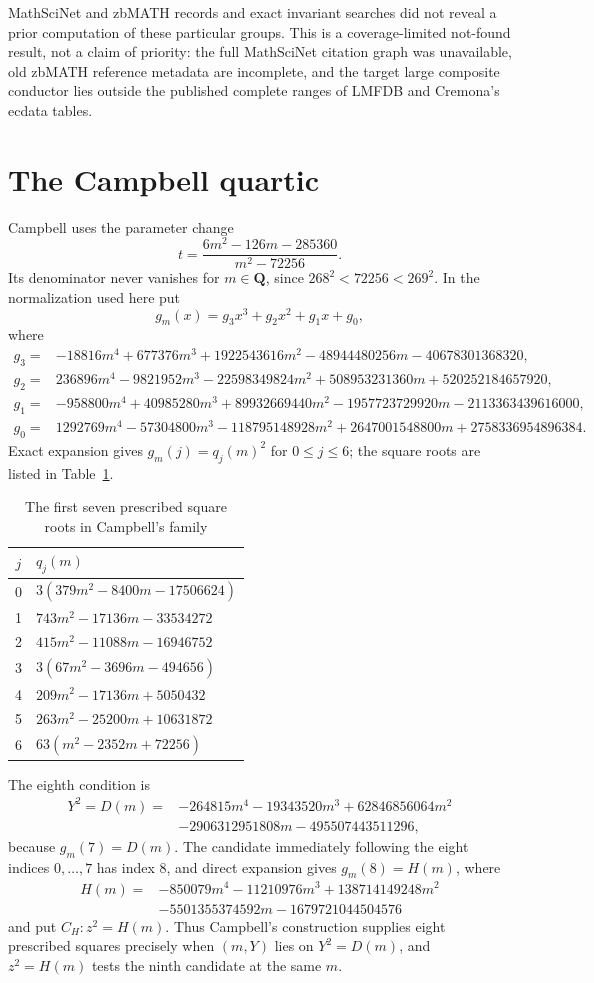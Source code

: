 \documentclass[11pt]{article}
\newcommand{\Q}{\mathbf Q}
\begin{document}
MathSciNet and zbMATH records and exact invariant searches did not reveal a
prior computation of these particular groups. This is a coverage-limited
not-found result, not a claim of priority: the full MathSciNet citation graph
was unavailable, old zbMATH reference metadata are incomplete, and the target
large composite conductor lies outside the published complete ranges of
LMFDB and Cremona's ecdata tables.

\section{The Campbell quartic}
Campbell \cite[Corollary~2.4 and Theorem~2.5]{Campbell2003} uses the
parameter change
\[
 t=\frac{6m^2-126m-285360}{m^2-72256}.
\]
Its denominator never vanishes for $m\in\Q$, since
$268^2<72256<269^2$.  In the normalization used here put
\[
 g_m(x)=g_3x^3+g_2x^2+g_1x+g_0,
\]
where
\begin{align*}
g_3={}&-18816m^4+677376m^3+1922543616m^2-48944480256m
-40678301368320,\\
g_2={}&236896m^4-9821952m^3-22598349824m^2+508953231360m
+520252184657920,\\
g_1={}&-958800m^4+40985280m^3+89932669440m^2-1957723729920m
-2113363439616000,\\
g_0={}&1292769m^4-57304800m^3-118795148928m^2+2647001548800m
+2758336954896384.
\end{align*}
Exact expansion gives $g_m(j)=q_j(m)^2$ for $0\le j\le6$; the square roots
are listed in Table~\ref{tab:campbell-roots}.
\begin{table}[ht]
\centering\small
\caption{The first seven prescribed square roots in Campbell's family}
\label{tab:campbell-roots}
\begin{tabular}{c@{\quad}l}
\toprule
$j$&$q_j(m)$\\ \midrule
0&$3(379m^2-8400m-17506624)$\\
1&$743m^2-17136m-33534272$\\
2&$415m^2-11088m-16946752$\\
3&$3(67m^2-3696m-494656)$\\
4&$209m^2-17136m+5050432$\\
5&$263m^2-25200m+10631872$\\
6&$63(m^2-2352m+72256)$\\ \bottomrule
\end{tabular}
\end{table}
The eighth condition is
\[
\begin{aligned}
Y^2=D(m)={}&-264815m^4-19343520m^3+62846856064m^2\\
&-2906312951808m-495507443511296,
\end{aligned}
\]
because $g_m(7)=D(m)$.  The candidate immediately following the eight
indices $0,\ldots,7$ has index $8$, and direct expansion gives $g_m(8)=H(m)$,
where
\[
 \begin{aligned}
 H(m)={}&-850079m^4-11210976m^3+138714149248m^2\\
        &-5501355374592m-1679721044504576
 \end{aligned}
\]
and put $C_H:z^2=H(m)$.  Thus Campbell's construction supplies eight
prescribed squares precisely when $(m,Y)$ lies on $Y^2=D(m)$, and
$z^2=H(m)$ tests the ninth candidate at the same $m$.
\end{document}
